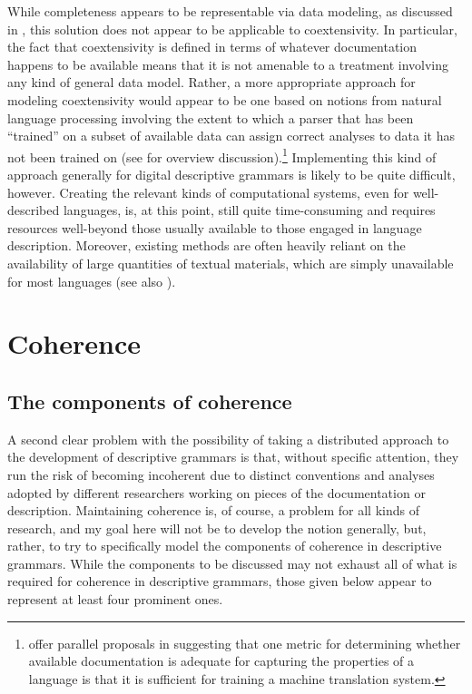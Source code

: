 While completeness appears to be representable via data modeling, as discussed
in , this solution does not appear to be applicable to
coextensivity. In particular, the fact that coextensivity is defined in terms of
whatever documentation happens to be available means that it is not amenable to
a treatment involving any kind of general data model. Rather, a more appropriate
approach for modeling coextensivity would appear to be one based on notions from
natural language processing involving the extent to which a parser that has been
``trained'' on a subset of available data can assign correct analyses to data it
has not been trained on (see  for overview discussion).\footnote{ offer parallel proposals in
suggesting that one metric for determining whether available documentation is
adequate for capturing the properties of a language is that it is sufficient for
training a machine translation system. } Implementing this kind of approach
generally for digital descriptive grammars is
likely to be quite difficult, however. Creating the relevant kinds of
computational systems, even for well-described languages, is, at this point,
still quite time-consuming and requires resources well-beyond those usually
available to those engaged in language description. Moreover, existing methods are
often heavily reliant on the availability of large quantities of
textual materials, which are simply unavailable for most languages (see also
).




\section{Coherence\label{Coherence}}

\subsection{The components of coherence\label{CoherenceComponents}}

A second clear problem with the possibility of taking a distributed approach to
the development of descriptive grammars is that, without specific attention,
they run the risk of becoming incoherent due to distinct conventions and
analyses adopted by different researchers working on pieces of the documentation
or description. Maintaining coherence is, of course, a problem
for all kinds of research, and my goal here will not be to develop the notion
generally, but, rather, to try to specifically model the components of coherence
in descriptive grammars. While the components to be discussed
may not exhaust all of what is required for coherence in
descriptive grammars, those given below appear to represent at least four prominent ones.


